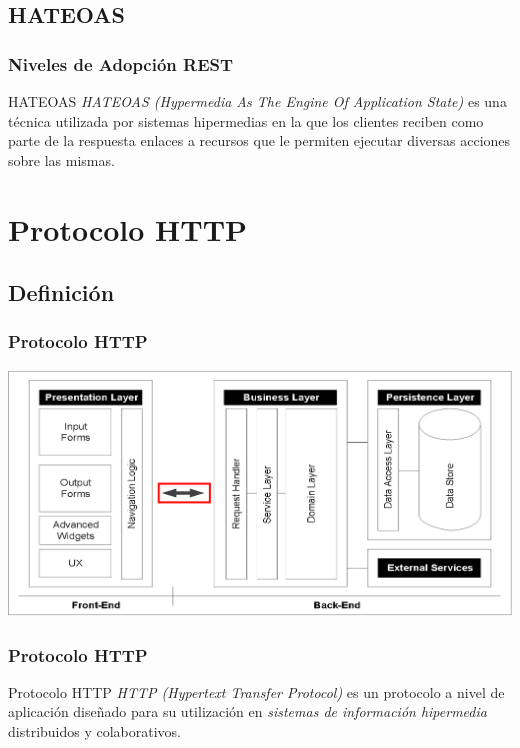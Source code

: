 \documentclass[handout,a4paper,slidestop,xcolor=pst,blue]{beamer}
\begin{document}
\subsection{HATEOAS}

\begin{frame}[c]
    \frametitle{Niveles de Adopción REST}
    \begin{block}{HATEOAS}
        \emph{HATEOAS (Hypermedia As The Engine Of Application State)} es una técnica utilizada por sistemas hipermedias en la que los clientes reciben como parte de la respuesta enlaces a recursos que le permiten ejecutar diversas acciones sobre las mismas.
    \end{block}
\end{frame}

\section{Protocolo HTTP}

\subsection{Definición}

\begin{frame}[c]
    \frametitle{Protocolo HTTP}
    \begin{center}
        \includegraphics[width=\linewidth]{images/http/enterpriseArchitectures02.eps}
    \end{center}
\end{frame}

\begin{frame}[c]
    \frametitle{Protocolo HTTP}
    \begin{block}{Protocolo HTTP}
        \emph{HTTP (Hypertext Transfer Protocol)} es un protocolo a nivel de aplicación diseñado para su utilización en \emph{sistemas de información hipermedia} distribuidos y colaborativos.
    \end{block}
\end{frame}
\end{document}
